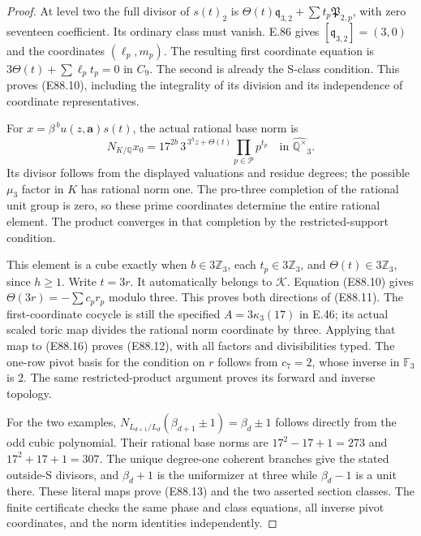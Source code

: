 \begin{proof}
At level two the full divisor
of $s(t)_2$ is
$\Theta(t)\mathfrak q_{3,2}
+\sum t_p\mathfrak P_{2,p}$,
with zero seventeen coefficient.
Its ordinary class must vanish.
E.86 gives
$[\mathfrak q_{3,2}]=(3,0)$
and the coordinates $(\ell_p,m_p)$.
The resulting first coordinate
equation is
$3\Theta(t)+\sum\ell_pt_p=0$
in $C_9$. The second is already
the S-class condition. This
proves (E88.10), including
the integrality of its
division and its independence
of coordinate representatives.

For $x=\beta^{\,b}u(z,\mathbf a)s(t)$,
the actual rational base norm is
\[
 N_{K/\mathbb Q}x_0
   =17^{2b}\,3^{\,3^h z+\Theta(t)}
                    \prod_{p\in\mathcal P}p^{t_p}
       \quad\text{in }\widehat{\mathbb Q^\times}_3 .
 \tag{E88.16}
\]
Its divisor follows from the
displayed valuations and
residue degrees; the possible
$\mu_3$ factor in $K$ has
rational norm one. The
pro-three completion of the
rational unit group is zero,
so these prime coordinates
determine the entire rational
element. The product converges
in that completion by the
restricted-support condition.

This element is a cube exactly
when $b\in3\mathbb Z_3$,
each $t_p\in3\mathbb Z_3$,
and $\Theta(t)\in3\mathbb Z_3$,
since $h\ge1$. Write $t=3r$.
It automatically belongs to
$\mathcal K$. Equation
(E88.10) gives
$\Theta(3r)=-\sum c_pr_p$
modulo three. This proves
both directions of (E88.11).
The first-coordinate cocycle
is still the specified
$A=3\kappa_3(17)$ in E.46;
its actual scaled toric map
divides the rational norm
coordinate by three. Applying
that map to (E88.16) proves
(E88.12), with all factors
and divisibilities typed.
The one-row pivot basis for
the condition on $r$ follows
from $c_7=2$, whose inverse
in $\mathbb F_3$ is $2$.
The same restricted-product
argument proves its forward
and inverse topology.

For the two examples,
$N_{L_{d+1}/L_d}(\beta_{d+1}\pm1)
=\beta_d\pm1$ follows directly
from the odd cubic polynomial.
Their rational base norms
are $17^2-17+1=273$ and
$17^2+17+1=307$. The unique
degree-one coherent branches
give the stated outside-S
divisors, and $\beta_d+1$
is the uniformizer at three
while $\beta_d-1$ is a unit
there. These literal maps
prove (E88.13) and the
two asserted section classes.
The finite certificate checks
the same phase and class
equations, all inverse pivot
coordinates, and the norm
identities independently.
\end{proof}
